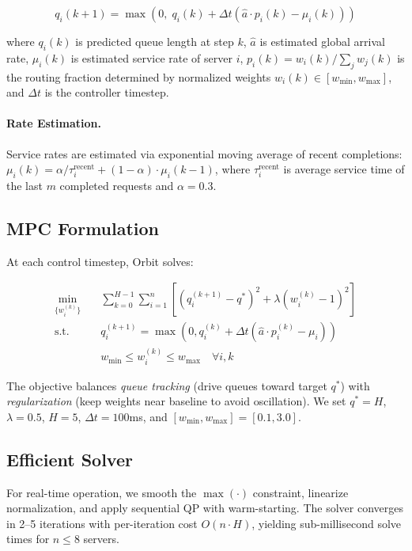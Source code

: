 \documentclass[runningheads]{llncs}
\begin{document}
\begin{equation}
q_i(k+1) = \max\left(0, \; q_i(k) + \Delta t \left( \hat{a} \cdot p_i(k) - \mu_i(k) \right)\right)
\label{eq:dynamics}
\end{equation}

where $q_i(k)$ is predicted queue length at step $k$, $\hat{a}$ is estimated global arrival rate, $\mu_i(k)$ is estimated service rate of server $i$, $p_i(k) = w_i(k) / \sum_j w_j(k)$ is the routing fraction determined by normalized weights $w_i(k) \in [w_{\min}, w_{\max}]$, and $\Delta t$ is the controller timestep.

\paragraph{Rate Estimation.} Service rates are estimated via exponential moving average of recent completions:
$\mu_i(k) = \alpha / \tau_i^{\text{recent}} + (1-\alpha) \cdot \mu_i(k-1)$,
where $\tau_i^{\text{recent}}$ is average service time of the last $m$ completed requests and $\alpha = 0.3$.

\subsection{MPC Formulation}

At each control timestep, Orbit solves:

\begin{align}
\min_{\{w_i^{(k)}\}} \quad & \sum_{k=0}^{H-1} \sum_{i=1}^{n} \left[ \left(q_i^{(k+1)} - q^*\right)^2 + \lambda \left(w_i^{(k)} - 1\right)^2 \right] \label{eq:objective} \\
\text{s.t.} \quad & q_i^{(k+1)} = \max\left(0, q_i^{(k)} + \Delta t(\hat{a} \cdot p_i^{(k)} - \mu_i)\right) \nonumber \\
& w_{\min} \leq w_i^{(k)} \leq w_{\max} \quad \forall i, k \nonumber
\end{align}

The objective balances \textit{queue tracking} (drive queues toward target $q^*$) with \textit{regularization} (keep weights near baseline to avoid oscillation). We set $q^* = H$, $\lambda = 0.5$, $H = 5$, $\Delta t = 100$ms, and $[w_{\min}, w_{\max}] = [0.1, 3.0]$.

\subsection{Efficient Solver}
\label{sec:solver}

For real-time operation, we smooth the $\max(\cdot)$ constraint, linearize normalization, and apply sequential QP with warm-starting. The solver converges in 2--5 iterations with per-iteration cost $O(n \cdot H)$, yielding sub-millisecond solve times for $n \leq 8$ servers.
\end{document}
